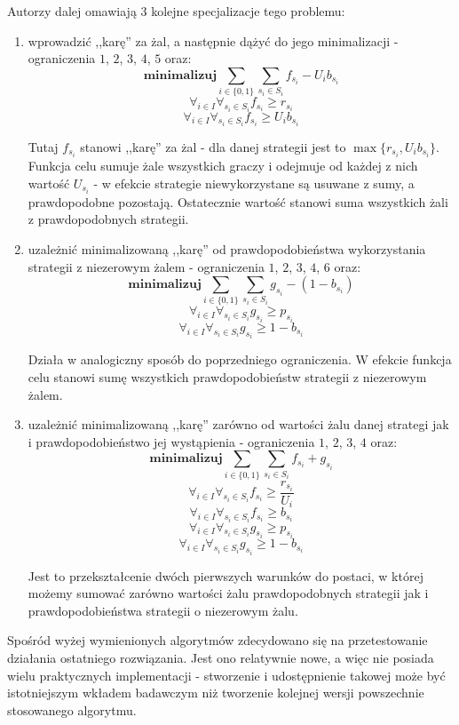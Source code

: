\documentclass[polish]{standalone}
\begin{document}
Autorzy dalej omawiają 3 kolejne specjalizacje tego problemu:
\begin{enumerate}
\item wprowadzić ,,karę'' za żal, a następnie dążyć do jego minimalizacji - ograniczenia $1$, $2$, $3$, $4$, $5$ oraz:
$$\textbf{minimalizuj} \sum_{i \in \{0,1\}} \sum_{s_i \in S_i} f_{s_i} - U_i b_{s_i}$$
$$\forall_{i \in I} \forall_{s_i \in S_i} f_{s_i} \geq r_{s_i}$$
$$\forall_{i \in I} \forall_{s_i \in S_i} f_{s_i} \geq U_i b_{s_i}$$
\cite[str.~2]{SCG-NE}

Tutaj $f_{s_i}$ stanowi ,,karę'' za żal - dla danej strategii jest to $\max \{ r_{s_i}, U_i b_{s_i} \}$. Funkcja celu
sumuje żale wszystkich graczy i odejmuje od każdej z nich wartość $U_{s_i}$ - w efekcie strategie niewykorzystane są
usuwane z sumy, a prawdopodobne pozostają. Ostatecznie wartość stanowi suma wszystkich żali z prawdopodobnych strategii.
\item uzależnić minimalizowaną ,,karę'' od prawdopodobieństwa wykorzystania strategii z niezerowym żalem - ograniczenia
$1$, $2$, $3$,
$4$, $6$ oraz:
$$\textbf{minimalizuj} \sum_{i \in \{0,1\}} \sum_{s_i \in S_i} g_{s_i} - (1 - b_{s_i})$$
$$\forall_{i \in I} \forall_{s_i \in S_i} g_{s_i} \geq p_{s_i}$$
$$\forall_{i \in I} \forall_{s_i \in S_i} g_{s_i} \geq 1 - b_{s_i}$$
\cite[str.~2]{SCG-NE}

Działa w analogiczny sposób do poprzedniego ograniczenia. W efekcie funkcja celu stanowi sumę wszystkich
prawdopodobieństw strategii z niezerowym żalem.
\item uzależnić minimalizowaną ,,karę'' zarówno od wartości żalu danej strategi jak i prawdopodobieństwo jej wystąpienia
- ograniczenia $1$, $2$, $3$, $4$ oraz:
$$\textbf{minimalizuj} \sum_{i \in \{0,1\}} \sum_{s_i \in S_i} f_{s_i} + g_{s_i}$$
$$\forall_{i \in I} \forall_{s_i \in S_i} f_{s_i} \geq \frac{r_{s_i}}{U_i}$$
$$\forall_{i \in I} \forall_{s_i \in S_i} f_{s_i} \geq b_{s_i}$$
$$\forall_{i \in I} \forall_{s_i \in S_i} g_{s_i} \geq p_{s_i}$$
$$\forall_{i \in I} \forall_{s_i \in S_i} g_{s_i} \geq 1 - b_{s_i}$$
\cite[str.~2--3]{SCG-NE}

Jest to przekształcenie dwóch pierwszych warunków do postaci, w której możemy sumować zarówno wartości żalu
prawdopodobnych strategii jak i prawdopodobieństwa strategii o niezerowym żalu.
\end{enumerate}

Spośród wyżej wymienionych algorytmów zdecydowano się na przetestowanie działania ostatniego rozwiązania. Jest ono
relatywnie nowe, a więc nie posiada wielu praktycznych implementacji - stworzenie i udostępnienie takowej może być
istotniejszym wkładem badawczym niż tworzenie kolejnej wersji powszechnie stosowanego algorytmu.
\end{document}

